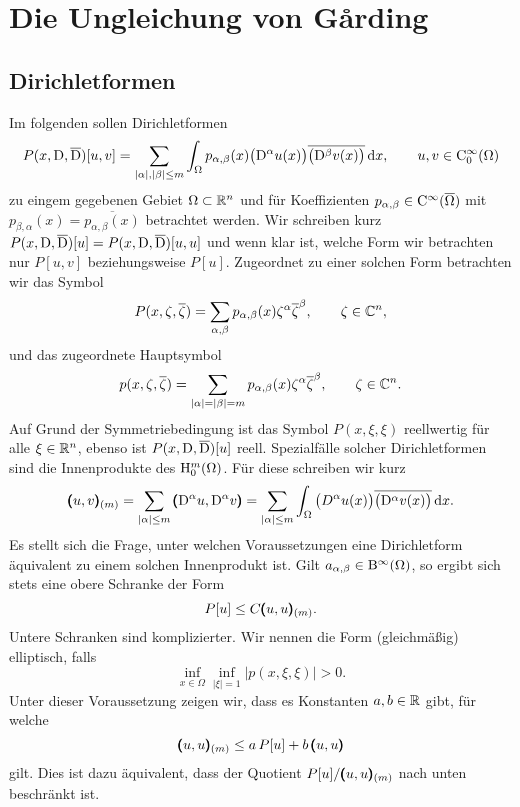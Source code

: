 \chapter{Die Ungleichung von G\r{a}rding}
\cite{Garding:1953}
\cite{Lax:1966}

\section{Dirichletformen}
Im folgenden sollen Dirichletformen 
\begin{equation}
   P(x,\mathrm D,\overline{\mathrm D})[u,v] = \sum_{|\alpha|,|\beta|\le m} \int_\Omega p_{\alpha,\beta}(x) \big(\mathrm D^\alpha u(x)\big) \overline{\big(\mathrm D^\beta v(x)\big)} \,\mathrm d x,\qquad u,v\in\mathrm C_0^\infty(\Omega)
\end{equation}
zu eingem gegebenen Gebiet $\Omega\subset\mathbb R^n$ und für Koeffizienten $p_{\alpha,\beta}\in\mathrm C^\infty(\overline{\Omega})$ mit $p_{\beta,\alpha}(x)=\overline{p_{\alpha,\beta}(x)}$  betrachtet werden. Wir schreiben kurz $P(x,\mathrm D,\overline{\mathrm D})[u]=P(x,\mathrm D,\overline{\mathrm D})[u,u]$ und wenn klar ist, welche Form wir betrachten nur $P[u,v]$ beziehungsweise $P[u]$. Zugeordnet zu einer solchen Form betrachten wir das Symbol
\begin{equation}
   P(x,\zeta,\overline\zeta) = \sum_{\alpha,\beta} p_{\alpha,\beta}(x) \zeta^\alpha\overline\zeta^\beta,\qquad \zeta\in\mathbb C^n,
\end{equation}
und das zugeordnete Hauptsymbol
\begin{equation}
   p(x,\zeta,\overline\zeta) = \sum_{|\alpha|=|\beta|=m} p_{\alpha,\beta}(x) \zeta^\alpha\overline\zeta^\beta,\qquad \zeta\in\mathbb C^n.
\end{equation}
Auf Grund der Symmetriebedingung ist das Symbol $P(x,\xi,\xi)$ reellwertig f\"ur alle $\xi\in\mathbb R^n$, ebenso ist 
$P(x,\mathrm D,\overline {\mathrm D})[u]$ reell. Spezialfälle solcher Dirichletformen sind die Innenprodukte des $\mathrm H^m_0(\Omega)$. Für diese schreiben wir kurz
\begin{equation}
  \pmb(u,v\pmb)_{(m)} = \sum_{|\alpha|\le m} \pmb(\mathrm D^\alpha u,\mathrm D^\alpha v\pmb) = \sum_{|\alpha|\le m} \int_\Omega   \big(D^\alpha u(x)\big) \overline{\big(\mathrm D^\alpha v(x)\big)} \,\mathrm d x.
\end{equation}
Es stellt sich die Frage, unter welchen Voraussetzungen eine Dirichletform äquivalent zu einem solchen Innenprodukt ist. Gilt $a_{\alpha,\beta}\in \mathrm B^\infty(\Omega)$, so ergibt sich stets eine obere Schranke der Form
\begin{equation}
    P[u] \le C \pmb(u,u\pmb)_{(m)}.
\end{equation}
Untere Schranken sind komplizierter. Wir nennen die Form (gleichmäßig) elliptisch, falls 
\begin{equation}
  \inf_{x\in\Omega}  \inf_{|\xi|=1} |p(x,\xi,\xi)| > 0.
\end{equation}
Unter dieser Voraussetzung zeigen wir, dass es Konstanten $a,b\in\mathbb R$ gibt, für welche
\begin{equation} 
   \pmb(u,u\pmb)_{(m)} \le a\, P[u] + b\, \pmb(u,u\pmb)
\end{equation}
gilt. Dies ist dazu äquivalent, dass der Quotient $P [u]  / \pmb(u,u\pmb)_{(m)}$ nach unten beschränkt ist.

